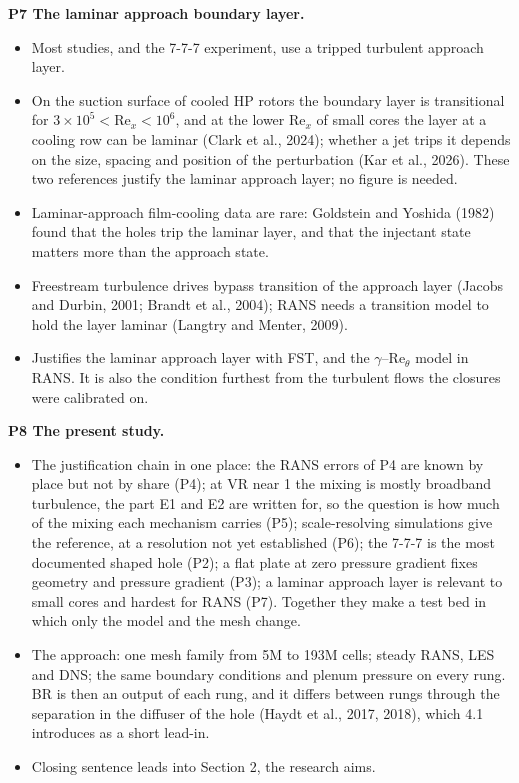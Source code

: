 \documentclass[10pt]{article}
\begin{document}
\textbf{P7 The laminar approach boundary layer.}
\begin{itemize}
\item Most studies, and the 7-7-7 experiment, use a tripped turbulent approach layer.
\item On the suction surface of cooled HP rotors the boundary layer is transitional for
  $3\times10^5<\mathrm{Re}_x<10^6$, and at the lower $\mathrm{Re}_x$ of small cores the layer at a cooling row
  can be laminar (Clark et al., 2024); whether a jet trips it depends on the size, spacing and position of the
  perturbation (Kar et al., 2026). These two references justify the laminar approach layer; no figure is
  needed.
\item Laminar-approach film-cooling data are rare: Goldstein and Yoshida (1982) found that the holes trip the
  laminar layer, and that the injectant state matters more than the approach state.
\item Freestream turbulence drives bypass transition of the approach layer (Jacobs and Durbin, 2001; Brandt et
  al., 2004); RANS needs a transition model to hold the layer laminar (Langtry and Menter, 2009).
\item Justifies the laminar approach layer with FST, and the $\gamma$--$\mathrm{Re}_\theta$ model in RANS. It is
  also the condition furthest from the turbulent flows the closures were calibrated on.
\end{itemize}

\textbf{P8 The present study.}
\begin{itemize}
\item The justification chain in one place: the RANS errors of P4 are known by place but not by share (P4);
  at VR near 1 the mixing is mostly broadband turbulence, the part E1 and E2 are written for, so the question is
  how much of the mixing each mechanism carries (P5); scale-resolving simulations give the reference, at a
  resolution not yet established (P6); the 7-7-7 is the most documented
  shaped hole (P2); a flat plate at zero pressure gradient fixes geometry and pressure gradient (P3); a laminar
  approach layer is relevant to small cores and hardest for RANS (P7). Together they make a test bed in which
  only the model and the mesh change.
\item The approach: one mesh family from 5M to 193M cells; steady RANS, LES and DNS; the same boundary conditions
  and plenum pressure on every rung. BR is then an output of each rung, and it differs between rungs through the
  separation in the diffuser of the hole (Haydt et al., 2017, 2018), which 4.1 introduces as a short lead-in.
\item Closing sentence leads into Section 2, the research aims.
\end{itemize}
\end{document}
